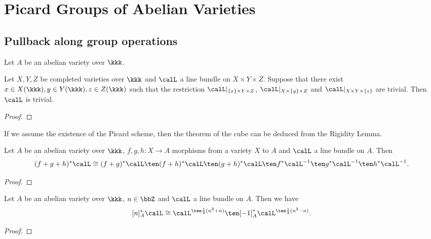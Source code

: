 \section{Picard Groups of Abelian Varieties}

\subsection{Pullback along group operations}

    \begin{theorem}\label{thm: seesaw theorem}
        Let \(A\) be an abelian variety over \(\kkk\). 
        
    \end{theorem}

    \begin{theorem}\label{thm: theorem of the cube}
        Let \(X,Y,Z\) be completed varieties over \(\kkk\) and \(\calL\) a line bundle on \(X \times Y \times Z\). 
        Suppose that there exist \(x \in X(\kkk), y \in Y(\kkk), z \in Z(\kkk)\) such that the restriction \(\calL|_{\{x\} \times Y \times Z}\), \(\calL|_{X \times \{y\} \times Z}\) and \(\calL|_{X \times Y \times \{z\}}\) are trivial. 
        Then \(\calL\) is trivial.
    \end{theorem}
    \begin{proof}
    \end{proof}

    \begin{remark}\label{rmk: theorem of the cube by rigidity lemma and picard scheme}
        If we assume the existence of the Picard scheme, then the theorem of the cube can be deduced from the Rigidity Lemma.
    \end{remark}

    \begin{proposition}
        Let \(A\) be an abelian variety over \(\kkk\), \(f,g,h: X \to A\) morphisms from a variety \(X\) to \(A\) and \(\calL\) a line bundle on \(A\).
        Then 
        \[ (f+g+h)^*\calL \cong (f+g)^*\calL \ten (f+h)^*\calL \ten (g+h)^*\calL \ten f^*\calL^{-1} \ten g^*\calL^{-1} \ten h^*\calL^{-1}. \]
    \end{proposition}
    \begin{proof}
    \end{proof}

    \begin{proposition}\label{prop: pull back of line bundles along the multiplication by n}
        Let \(A\) be an abelian variety over \(\kkk\), \(n\in \bbZ\) and \(\calL\) a line bundle on \(A\). 
        Then we have 
        \[ [n]_A^*\calL \cong \calL^{\ten \frac{1}{2}(n^2+n)} \ten [-1]_A^*\calL^{\ten \frac{1}{2}(n^2-n)}. \]
    \end{proposition}
    \begin{proof}
    \end{proof}


